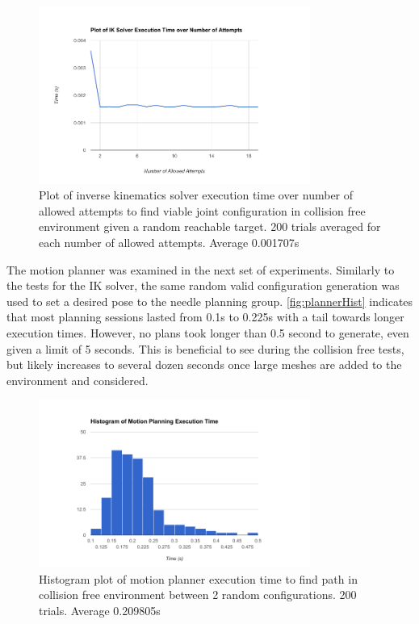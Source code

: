 \documentclass[12pt]{report}
\begin{document}
\begin{figure}[thpb]
	\centering
	\includegraphics[width = 3.5in]{graphs/ik_sover_over_time.png}
    \caption{Plot of inverse kinematics solver execution time over number of allowed attempts to find viable joint configuration in collision free environment given a random reachable target. 200 trials averaged for each number of allowed attempts. Average 0.001707s}
    \label{fig:ikNumAttempts}
\end{figure}

The motion planner was examined in the next set of experiments. Similarly to the tests for the IK solver, the same random valid configuration generation was used to set a desired pose to the needle planning group. \autoref{fig:plannerHist} indicates that most planning sessions lasted from 0.1s to 
0.225s with a tail towards longer execution times. However, no plans took longer than 0.5 second to generate, even given a limit of 5 seconds. This is beneficial to see during the collision free tests, but likely increases to several dozen seconds once large meshes are added to the environment and considered.

\begin{figure}[thpb]
	\centering
	\includegraphics[width = 3.5in]{graphs/planner_hist.png}
    \caption{Histogram plot of motion planner execution time to find path in collision free environment between 2 random configurations. 200 trials. Average 0.209805s}
    \label{fig:plannerHist}
\end{figure}
\end{document}
